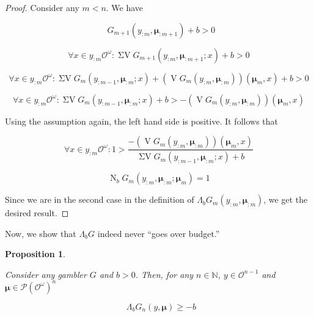 \documentclass[11pt]{article}
\theoremstyle{definition}
\theoremstyle{plain}
\newtheorem{proposition}{Proposition}%
\newcommand{\Nats}{\mathbb{N}}
\newcommand{\PM}{\mathcal{P}}
\newcommand{\Ob}{\mathcal{O}}
\newcommand{\OO}{\Ob^\omega}
\newcommand{\PMO}{\PM(\OO)}
\DeclareMathOperator{\V}{V}
\DeclareMathOperator{\SV}{\Sigma V}
\DeclareMathOperator{\SVM}{\Sigma V_{\min}}
\DeclareMathOperator{\Nr}{N}
\newcommand{\Bd}{\Lambda}
\newcommand{\BM}{\bm{\mu}}
\begin{document}
\begin{proof}

Consider any $m < n$. We have

$$\SVM G_{m+1}(y_{:m},\BM_{:m+1}) + b > 0$$

$$\forall x \in y_{:m}\OO: \SV G_{m+1}(y_{:m},\BM_{:m+1}; x) + b > 0$$

$$\forall x \in y_{:m}\OO: \SV G_{m}(y_{:m-1},\BM_{:m}; x) + (\V G_{m}(y_{:m},\BM_{:m}))(\BM_{m}, x) + b > 0$$

$$\forall x \in y_{:m}\OO: \SV G_{m}(y_{:m-1},\BM_{:m}; x) + b > -(\V G_{m}(y_{:m},\BM_{:m}))(\BM_{m}, x)$$

Using the assumption again, the left hand side is positive. It follows that

$$\forall x \in y_{:m}\OO: 1 > \frac{-(\V G_{m}(y_{:m},\BM_{:m}))(\BM_{m}, x)}{\SV G_{m}(y_{:m-1},\BM_{:m}; x) + b}$$

$$\Nr_b G_m(y_{:m},\BM_{:m};\BM_m) = 1$$

Since we are in the second case in the definition of ${\Bd_b G_m(y_{:m},\BM_{:m})}$, we get the desired result.
\end{proof}

Now, we show that $\Bd_b G$ indeed never \enquote{goes over budget.}

\begin{proposition}
\label{prp:b_stays_in_budget}

Consider any gambler $G$ and $b > 0$. Then, for any $n \in \Nats$, $y \in \Ob^{n-1}$ and $\BM \in \PMO^n$

\begin{equation}
\SVM \Bd_b G_n(y,\BM) \geq -b
\end{equation} 

\end{proposition}
\end{document}
